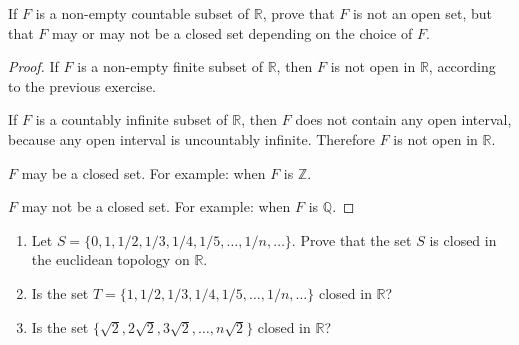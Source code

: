 \begin{exercise}
	If $F$ is a non-empty countable subset of $\mathbb{R}$, prove that $F$ is not an open set, but that $F$ may or may not be a closed set depending on the choice of $F$.
\end{exercise}

\begin{proof}
	If $F$ is a non-empty finite subset of $\mathbb{R}$, then $F$ is not open in $\mathbb{R}$, according to the previous exercise.

	If $F$ is a countably infinite subset of $\mathbb{R}$, then $F$ does not contain any open interval, because any open interval is uncountably infinite. Therefore $F$ is not open in $\mathbb{R}$.

	$F$ may be a closed set. For example: when $F$ is $\mathbb{Z}$.

	$F$ may not be a closed set. For example: when $F$ is $\mathbb{Q}$.
\end{proof}
\newpage

\begin{exercise}
	\begin{enumerate}[label={(\roman*)}]
		\item Let $S = \{ 0, 1, 1/2, 1/3, 1/4, 1/5, \ldots, 1/n, \ldots \}$. Prove that the set $S$ is closed in the euclidean topology on $\mathbb{R}$.
		\item Is the set $T = \{ 1, 1/2, 1/3, 1/4, 1/5, \ldots, 1/n, \ldots \}$ closed in $\mathbb{R}$?
		\item Is the set $\{ \sqrt{2}, 2\sqrt{2}, 3\sqrt{2}, \ldots, n\sqrt{2} \}$ closed in $\mathbb{R}$?
	\end{enumerate}
\end{exercise}

